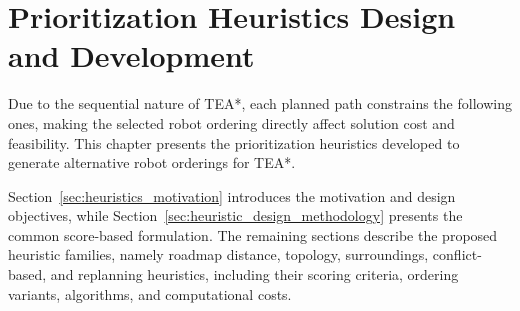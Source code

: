 \chapter{Prioritization Heuristics Design and Development}
\label{chap:ch5}
\hspace{\parindent}
Due to the sequential nature of TEA*, each planned path constrains the following ones, making the
selected robot ordering directly affect solution cost and feasibility. This chapter presents
the prioritization heuristics developed to generate alternative robot orderings for TEA*.

Section~\ref{sec:heuristics_motivation} introduces the motivation and design objectives, while
Section~\ref{sec:heuristic_design_methodology} presents the common score-based formulation.
The remaining sections describe the proposed heuristic families, namely roadmap distance,
topology, surroundings, conflict-based, and replanning heuristics, including their scoring criteria,
ordering variants, algorithms, and computational costs.

